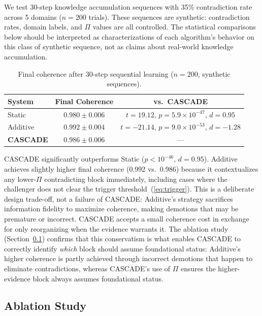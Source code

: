 \documentclass[11pt,a4paper]{article}
\theoremstyle{definition}
\newcommand{\tp}{\Pi}
\begin{document}
We test 30-step knowledge accumulation sequences with 35\% contradiction rate across 5
domains ($n = 200$ trials). These sequences are synthetic: contradiction rates, domain
labels, and $\tp$ values are all controlled. The statistical comparisons below should be
interpreted as characterizations of each algorithm's behavior on this class of synthetic
sequence, not as claims about real-world knowledge accumulation.

\begin{table}[H]
\centering
\caption{Final coherence after 30-step sequential learning ($n=200$, synthetic sequences).}
\label{tab:sequential}
\begin{tabular}{@{}lcc@{}}
\toprule
\textbf{System} & \textbf{Final Coherence} & \textbf{vs.\ CASCADE} \\
\midrule
Static   & $0.980 \pm 0.006$ & $t = 19.12$, $p = 5.9 \times 10^{-47}$, $d = 0.95$ \\
Additive & $0.992 \pm 0.004$ & $t = -21.14$, $p = 9.0 \times 10^{-53}$, $d = -1.28$ \\
\textbf{CASCADE} & $\mathbf{0.986 \pm 0.006}$ & --- \\
\bottomrule
\end{tabular}
\end{table}

CASCADE significantly outperforms Static ($p < 10^{-46}$, $d = 0.95$). Additive
achieves slightly higher final coherence (0.992 vs.\ 0.986) because it contextualizes
any lower-$\tp$ contradicting block immediately, including cases where the challenger
does not clear the trigger threshold~(\ref{eq:trigger}). This is a deliberate
design trade-off, not a failure of CASCADE: Additive's strategy sacrifices information
fidelity to maximize coherence, making demotions that may be premature or incorrect.
CASCADE accepts a small coherence cost in exchange for only reorganizing when the
evidence warrants it. The ablation study (Section~\ref{sec:ablation}) confirms that
this conservatism is what enables CASCADE to correctly identify \emph{which} block
should assume foundational status: Additive's higher coherence is partly achieved
through incorrect demotions that happen to eliminate contradictions, whereas CASCADE's
use of $\tp$ ensures the higher-evidence block always assumes foundational status.

\subsection{Ablation Study}\label{sec:ablation}
\end{document}

